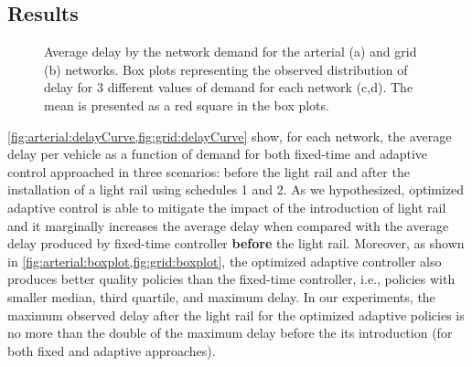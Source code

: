 \subsection{Results}

\begin{figure*}[t!] \centering
%
\caption{Average delay by the network demand for the arterial (a) and grid (b)
networks. Box plots representing the observed distribution of delay for 3
different values of demand for each network (c,d). The mean is presented as a
red square in the box plots.}
%
\label{fig:delayCurveAndBoxplot} \end{figure*}


%


%
\cref{fig:arterial:delayCurve,fig:grid:delayCurve} show, for each network, the
average delay per vehicle as a function of demand for both fixed-time and adaptive
control approached in three scenarios: before the light rail and after the
installation of a light rail using schedules 1 and 2.
%
As we hypothesized, optimized adaptive control is able to mitigate the impact of
the introduction of light rail and it marginally increases the average delay
when compared with the average delay produced by fixed-time controller
\textbf{before} the light rail.
%
Moreover, as shown in \cref{fig:arterial:boxplot,fig:grid:boxplot}, the optimized
adaptive controller also produces better quality policies than the fixed-time
controller, i.e., policies with smaller median, third quartile, and maximum
delay.
%
In our experiments, the maximum observed delay after the light rail for the
optimized adaptive policies is no more than the double of the maximum delay before
the its introduction (for both fixed and adaptive approaches).



